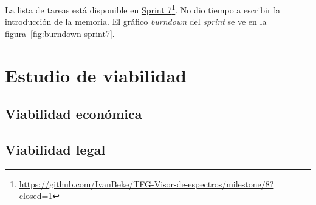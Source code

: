 La lista de tareas está disponible en \href{https://github.com/IvanBeke/TFG-Visor-de-espectros/milestone/8?closed=1}{Sprint 7}\footnote{\url{https://github.com/IvanBeke/TFG-Visor-de-espectros/milestone/8?closed=1}}. No dio tiempo a escribir la introducción de la memoria. El gráfico \textit{burndown} del \textit{sprint} se ve en la figura~\ref{fig:burndown-sprint7}.\\


\section{Estudio de viabilidad}

\subsection{Viabilidad económica}

\subsection{Viabilidad legal}


